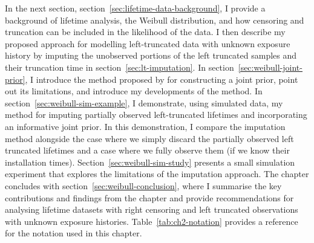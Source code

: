 
In the next section, section~\ref{sec:lifetime-data-background}, I provide a background of lifetime analysis, the Weibull distribution, and how censoring and truncation can be included in the likelihood of the data. I then describe my proposed approach for modelling left-truncated data with unknown exposure history by imputing the unobserved portions of the left truncated samples and their truncation time in section~\ref{sec:lt-imputation}. In section~\ref{sec:weibull-joint-prior}, I introduce the method proposed by \citet{kaminskiy2005} for constructing a joint prior, point out its limitations, and introduce my developments of the method. In section~\ref{sec:weibull-sim-example}, I demonstrate, using simulated data, my method for imputing partially observed left-truncated lifetimes and incorporating an informative joint prior. In this demonstration, I compare the imputation method alongside the case where we simply discard the partially observed left truncated lifetimes and a case where we fully observe them (if we know their installation times). Section~\ref{sec:weibull-sim-study} presents a small simulation experiment that explores the limitations of the imputation approach. The chapter concludes with section~\ref{sec:weibull-conclusion}, where I summarise the key contributions and findings from the chapter and provide recommendations for analysing lifetime datasets with right censoring and left truncated observations with unknown exposure histories. Table~\ref{tab:ch2-notation} provides a reference for the notation used in this chapter.

